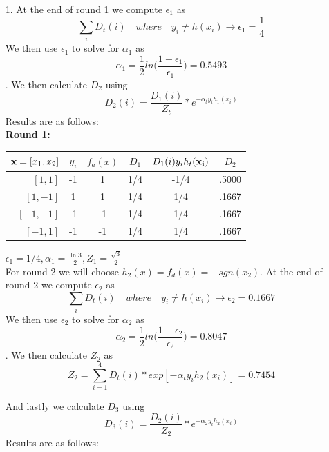 \documentclass[11pt,a4paper]{article}
\begin{document}
		\begin{itemize}
			\item [1.]
			At the end of round 1 we compute $\epsilon_1$ as $$\displaystyle\sum_{i} D_t (i) \quad where \quad y_i \neq h(x_i) \rightarrow \epsilon_1 = \frac{1}{4} $$ We then use $\epsilon_1$ to solve for $\alpha_1$ as $$\alpha_1 = \frac{1}{2} ln \Big( \frac{1-\epsilon_1}{\epsilon_1} \Big) = 0.5493$$. We then calculate $D_2$ using $$D_2(i) = \frac{D_1(i)}{Z_t}*e^{-\alpha_t y_i h_1(x_i)}$$ Results are as follows:\\
			
				\textbf{Round 1:}
				\begin{center}
					\begin{tabular}{rccccc}
						\toprule
						${\bf x} = [x_1,x_2]$ & $y_i$ & $f_a(x)$ & $D_1$ & $D_{1}(i)y_{i}h_t({\bf x_i})$ & $D_2$ \\
						\midrule
						$[1,  1]$             & -1    & 1        & 1/4   & -1/4                          &  .5000     \\
						$[1, -1]$             & 1     & 1        & 1/4   & 1/4                           &  .1667     \\
						$[-1,-1]$             & -1    & -1       & 1/4   & 1/4                           &  .1667     \\
						$[-1, 1]$             & -1    & -1       & 1/4   & 1/4                           &  .1667     \\
						\bottomrule
					\end{tabular}
				\end{center}
			$\epsilon_1 = 1/4, \alpha_1 = \frac{\ln3}{2}, Z_1 = \frac{\sqrt{3}}{2}$ \\
			
			For round 2 we will choose $h_2(x) = f_d(x) = -sgn(x_2)$. At the end of round 2 we compute $\epsilon_2$ as $$\displaystyle\sum_{i} D_t (i) \quad where \quad y_i \neq h(x_i) \rightarrow \epsilon_2 = 0.1667 $$ We then use $\epsilon_2$ to solve for $\alpha_2$ as $$\alpha_2 = \frac{1}{2} ln \Big( \frac{1-\epsilon_2}{\epsilon_2} \Big) = 0.8047$$. We then calculate $Z_2$ as $$Z_2 = \displaystyle\sum_{i=1}^4 D_t(i)*exp[-\alpha_t y_i h_2(x_i)] = 0.7454$$
			
			And lastly we calculate $D_3$ using $$D_3(i) = \frac{D_2(i)}{Z_2}*e^{-\alpha_2 y_i h_2(x_i)}$$ Results are as follows:\\
			

\end{itemize}
\end{document}
